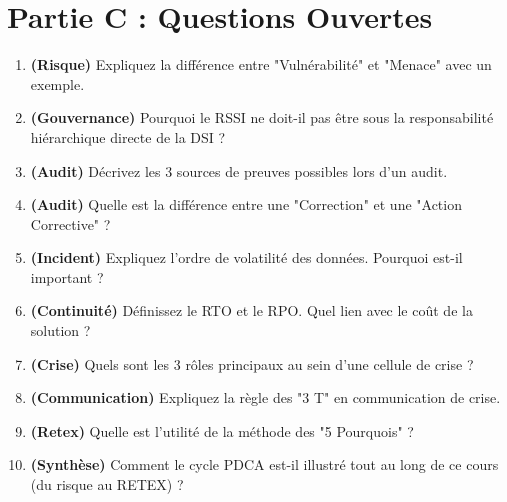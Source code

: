 \section{Partie C : Questions Ouvertes}

\begin{enumerate}
    \item \textbf{(Risque)} Expliquez la différence entre "Vulnérabilité" et "Menace" avec un exemple.
    \item \textbf{(Gouvernance)} Pourquoi le RSSI ne doit-il pas être sous la responsabilité hiérarchique directe de la DSI ?
    \item \textbf{(Audit)} Décrivez les 3 sources de preuves possibles lors d'un audit.
    \item \textbf{(Audit)} Quelle est la différence entre une "Correction" et une "Action Corrective" ?
    \item \textbf{(Incident)} Expliquez l'ordre de volatilité des données. Pourquoi est-il important ?
    \item \textbf{(Continuité)} Définissez le RTO et le RPO. Quel lien avec le coût de la solution ?
    \item \textbf{(Crise)} Quels sont les 3 rôles principaux au sein d'une cellule de crise ?
    \item \textbf{(Communication)} Expliquez la règle des "3 T" en communication de crise.
    \item \textbf{(Retex)} Quelle est l'utilité de la méthode des "5 Pourquois" ?
    \item \textbf{(Synthèse)} Comment le cycle PDCA est-il illustré tout au long de ce cours (du risque au RETEX) ?
\end{enumerate}